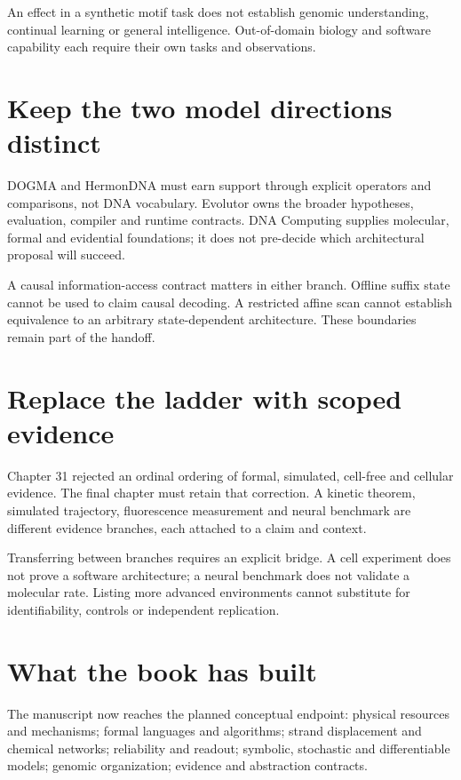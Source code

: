 An effect in a synthetic motif task does not establish genomic understanding,
continual learning or general intelligence. Out-of-domain biology and software
capability each require their own tasks and observations.

\section{Keep the two model directions distinct}
DOGMA and HermonDNA must earn support through explicit operators and comparisons,
not DNA vocabulary. Evolutor owns the broader hypotheses, evaluation, compiler
and runtime contracts. DNA Computing supplies molecular, formal and evidential
foundations; it does not pre-decide which architectural proposal will succeed.

A causal information-access contract matters in either branch. Offline suffix
state cannot be used to claim causal decoding. A restricted affine scan cannot
establish equivalence to an arbitrary state-dependent architecture. These
boundaries remain part of the handoff.

\section{Replace the ladder with scoped evidence}
Chapter 31 rejected an ordinal ordering of formal, simulated, cell-free and
cellular evidence. The final chapter must retain that correction.
A kinetic theorem, simulated trajectory, fluorescence measurement and neural
benchmark are different evidence branches, each attached to a claim and context.

Transferring between branches requires an explicit bridge. A cell experiment
does not prove a software architecture; a neural benchmark does not validate a
molecular rate. Listing more advanced environments cannot substitute for
identifiability, controls or independent replication.

\section{What the book has built}
The manuscript now reaches the planned conceptual endpoint: physical resources
and mechanisms; formal languages and algorithms; strand displacement and
chemical networks; reliability and readout; symbolic, stochastic and
differentiable models; genomic organization; evidence and abstraction contracts.

